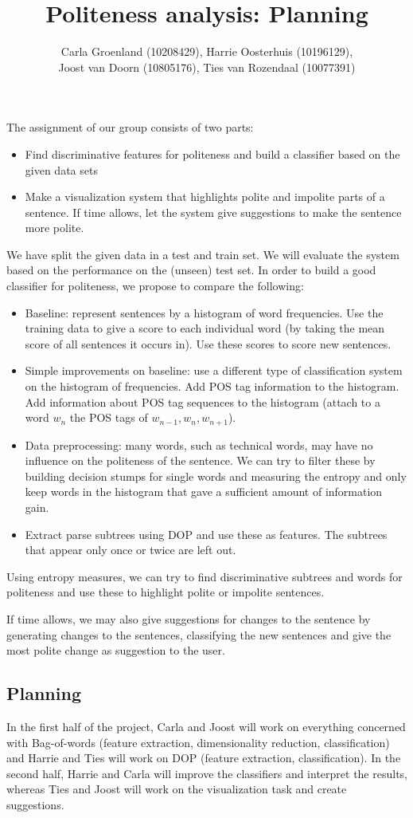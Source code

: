 \documentclass[11pt, english]{article}
\title{Politeness analysis: Planning}
\author{Carla Groenland (10208429), Harrie Oosterhuis (10196129), \\
Joost van Doorn (10805176), Ties van Rozendaal (10077391)}
\begin{document}
\maketitle
\noindent The assignment of our group consists of two parts:
\begin{itemize}
\item Find discriminative features for politeness and build a classifier based on the given data sets
\item Make a visualization system that highlights polite and impolite parts of a sentence. If time allows, let the system give suggestions to make the sentence more polite.
\end{itemize}
We have split the given data in a test and train set. We will evaluate the system based on the performance on the (unseen) test set.
In order to build a good classifier for politeness, we propose to compare the following:
\begin{itemize}
\item Baseline: represent sentences by a histogram of word frequencies. Use the training data to give a score to each individual word (by taking the mean score of all sentences it occurs in). Use these scores to score new sentences. 
\item Simple improvements on baseline: use a different type of classification system on the histogram of frequencies. Add POS tag information to the histogram. Add information about POS tag sequences to the histogram (attach to a word $w_n$ the POS tags of $w_{n-1},w_n,w_{n+1}$).
\item Data preprocessing: many words, such as technical words, may have no influence on the politeness of the sentence. We can try to filter these by building decision stumps for single words and measuring the entropy and only keep words in the histogram that gave a sufficient amount of information gain.
\item Extract parse subtrees using DOP and use these as features. The subtrees that appear only once or twice are left out. 
\end{itemize}
Using entropy measures, we can try to find discriminative subtrees and words for politeness and use these to highlight polite or impolite sentences. 

If time allows, we may also give suggestions for changes to the sentence by generating changes to the sentences, classifying the new sentences and give the most polite change as suggestion to the user.

\subsection*{Planning}
In the first half of the project, Carla and Joost will work on everything concerned with Bag-of-words (feature extraction, dimensionality reduction, classification) and Harrie and Ties will work on DOP (feature extraction, classification). In the second half, Harrie and Carla will improve the classifiers and interpret the results, whereas Ties and Joost will work on the visualization task and create suggestions.  
\end{document}

